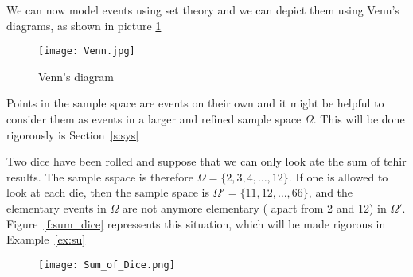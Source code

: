 We can now model events using set theory and we can depict them using Venn's diagrams, as shown in picture \ref{f:Venn} 
\begin{figure}[h]
	\texttt{[image: Venn.jpg]}
	\caption{ Venn's diagram\label{f:Venn}}
\end{figure}
	 

Points in the sample space are events on their own and it might be helpful to consider them as events in a larger and refined sample space $\Omega$. This will be done rigorously is Section~\ref{s:sys}

\begin{example}
	\label{ex:sum_restriction}
	Two dice have been rolled and suppose that we can only look ate the sum of tehir results. The sample sspace is therefore $\Omega = \{2,3,4,\ldots, 12\}$. If one is allowed to look at each die, then the sample space is $\Omega' = \{11,12,\ldots, 66\}$, and the elementary events in $\Omega$ are not anymore elementary ( apart from 2 and 12) in $\Omega'$. Figure~\ref{f:sum_dice} repressents this situation, which will be made rigorous in Example~\ref{ex:su}

\begin{figure}[h]
\texttt{[image: Sum\_of\_Dice.png]}
\label{f:square}
\end{figure}

\end{example}

